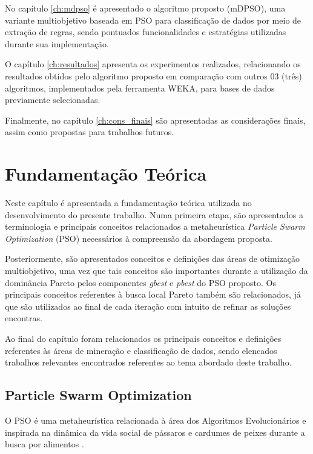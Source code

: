 \documentclass[
	12pt,				%
	openany,			%
	oneside,	
	a4paper,			%
	brazil,				%
	]{unimontes-ppgmsc-abntex2}
\begin{document}
No capítulo \ref{ch:mdpso} é apresentado o algoritmo proposto (mDPSO), uma variante multiobjetivo baseada em PSO para classificação de dados por meio de extração de regras, sendo pontuados funcionalidades e estratégias utilizadas durante sua implementação.

O capítulo \ref{ch:resultados} apresenta os experimentos realizados, relacionando os resultados obtidos pelo algoritmo proposto em comparação com outros 03 (três) algoritmos, implementados pela ferramenta WEKA, para bases de dados previamente selecionadas.

Finalmente, no capítulo \ref{ch:cons_finais} são apresentadas as considerações finais, assim como propostas para trabalhos futuros.


\chapter{Fundamentação Teórica}
\label{ch:ref_teorico}

Neste capítulo é apresentada a fundamentação teórica utilizada no desenvolvimento do presente trabalho. Numa primeira etapa, são apresentados a terminologia e principais conceitos relacionados a metaheurística {\em Particle Swarm Optimization} (PSO) necessários à compreensão da abordagem proposta. 

Posteriormente, são apresentados conceitos e definições das áreas de otimização multiobjetivo, uma vez que tais conceitos são importantes durante a utilização da dominância Pareto pelos componentes {\em gbest} e {\em pbest} do PSO proposto. Os principais conceitos referentes à busca local Pareto também são relacionados, já que são utilizados ao final de cada iteração com intuito de refinar as soluções encontras. 

Ao final do capítulo foram relacionados os principais conceitos e definições referentes às áreas de mineração e classificação de dados, sendo elencados trabalhos relevantes encontrados referentes ao tema abordado deste trabalho.


\section{Particle Swarm Optimization}
\label{ch:pso}

O PSO é uma metaheurística relacionada à área dos Algoritmos Evolucionários e inspirada na dinâmica da vida social de pássaros e cardumes de peixes durante a busca por alimentos \cite{Kennedy_1995}.
\end{document}
